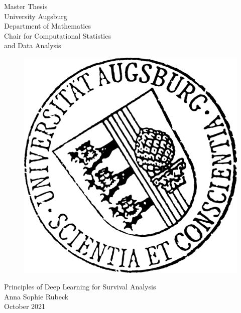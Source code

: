 \documentclass[12pt, a4paper]{article}
\theoremstyle{definition}
\theoremstyle{plain}
\numberwithin{equation}{section}
\numberwithin{figure}{section}
\numberwithin{table}{section}
\begin{document}
	
	\listoftodos
	\newpage

	\begin{center}
		\Huge Master Thesis\\
		\vspace{0.5cm}
		\LARGE University Augsburg\\
		\vspace{0.3cm}
		Department of Mathematics\\
		\vspace{0.3cm}
		Chair for Computational Statistics\\ and Data Analysis
		\vspace{0.7cm}
		
		
	\end{center}
	\vspace{0.5cm}
	
	\begin{figure}[h]
		\begin{center}
			\includegraphics[scale=1.35]
			{Uni_Aug_Siegel_32Grad_schwarz.png}
		\end{center}
	\end{figure}
	
	\begin{center}
		\vspace{0.4cm}
		{\LARGE{{Principles of Deep Learning for Survival Analysis}}}\\
		\vspace{2cm}
		\LARGE {Anna Sophie Rubeck}\\
		\vspace{0.9cm}
		\large{October 2021}
	\end{center}
	\newpage
\end{document}
